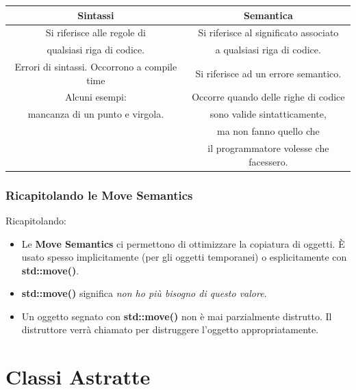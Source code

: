 \begin{tabular}{|c|c|}
	\hline
	\textbf{Sintassi} & \textbf{Semantica} \\
	\hline
	\textsf{\small Si riferisce alle regole di } & \textsf{\small Si riferisce al significato associato } \\
	\textsf{\small qualsiasi riga di codice.} & \textsf{\small a qualsiasi riga di codice.} \\
	\hline
	\textsf{\small Errori di sintassi. Occorrono a compile time} & \textsf{\small Si riferisce ad un errore semantico. } \\
	\textsf{\small Alcuni esempi: } & \textsf{\small Occorre quando delle righe di codice } \\
	\textsf{\small mancanza di un punto e virgola.} & \textsf{\small sono valide sintatticamente,} \\
	\textsf{\small } & \textsf{\small ma non fanno quello che } \\
	\textsf{\small } & \textsf{\small il programmatore volesse che facessero.} \\
	\hline
\end{tabular}

\subsubsection{Ricapitolando le Move Semantics}

\textsf{\small Ricapitolando: } \\

\begin{itemize}
	\item \textsf{\small Le \textbf{Move Semantics} ci permettono di ottimizzare la copiatura di oggetti. È usato spesso implicitamente (per gli oggetti temporanei) o esplicitamente con \textbf{std::move()}.}
	\item \textsf{\small \textbf{std::move()} significa \emph{non ho più bisogno di questo valore}.}
	\item \textsf{\small Un oggetto segnato con \textbf{std::move()} non è mai parzialmente distrutto. Il distruttore verrà chiamato per distruggere l'oggetto appropriatamente.}
\end{itemize}


\newpage

\section{Classi Astratte}

